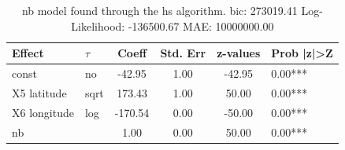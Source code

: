 \begin{table}
	\caption{nb model found through the hs algorithm. bic: 273019.41 Log-Likelihood: -136500.67 MAE: 10000000.00}
	\begin{center}
		\begin{tabular}{|l|l|c|c|c|l|}
			\hline
			Effect & $\tau$ & Coeff & Std. Err & z-values & Prob |z|>Z \\
			\hline
			const & no & -42.95 & 1.00 & -42.95 & 0.00*** \\
			\hline
			X5 latitude & sqrt & 173.43 & 1.00 & 50.00 & 0.00*** \\
			\hline
			X6 longitude & log & -170.54 & 0.00 & -50.00 & 0.00*** \\
			\hline
			nb &  & 1.00 & 0.00 & 50.00 & 0.00*** \\
			\hline
		\end{tabular}
	\end{center}
\end{table}